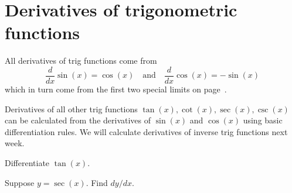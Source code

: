 \documentclass[../main.tex]{subfiles}
\begin{document}
 \section{Derivatives of trigonometric functions}
All derivatives of trig functions come from \[\frac{d}{dx}\sin(x) = \cos(x) \quad\text{and}\quad \frac{d}{dx} \cos(x) = -\sin(x)\] which in turn come from the first two special limits on page~\pageref{eg:limit-change-of-variable}.

Derivatives of all other trig functions \(\tan(x), \cot(x), \sec(x), \csc(x)\) can be calculated from the derivatives of \(\sin(x)\) and \(\cos(x)\) using basic differentiation rules. We will calculate derivatives of inverse trig functions next week.

\begin{example}
  Differentiate \(\tan(x)\).

\end{example}

\begin{example}
  Suppose \(y = \sec(x)\). Find \(dy/dx\).

\end{example}
\end{document}
